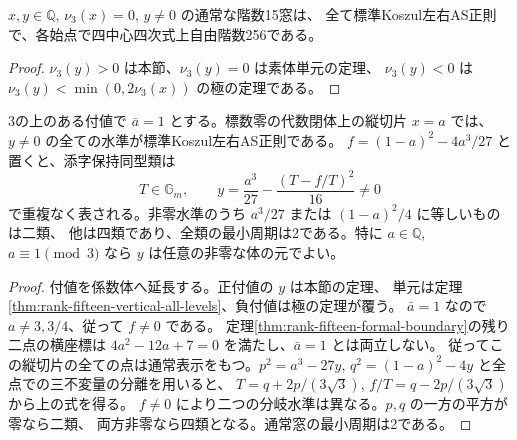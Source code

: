 \begin{corollary}
$x,y\in\mathbb Q$, $\nu_3(x)=0$, $y\ne0$ の通常な階数15窓は、
全て標準Koszul左右AS正則で、各始点で四中心四次式上自由階数256である。
\end{corollary}
\begin{proof}
$\nu_3(y)>0$ は本節、$\nu_3(y)=0$ は素体単元の定理、
$\nu_3(y)<0$ は $\nu_3(y)<\min(0,2\nu_3(x))$ の極の定理である。
\end{proof}

\begin{corollary}\label{cor:rank-fifteen-unit-vertical-conics}
3の上のある付値で $\bar a=1$ とする。標数零の代数閉体上の縦切片 $x=a$ では、
$y\ne0$ の全ての水準が標準Koszul左右AS正則である。
$f=(1-a)^2-4a^3/27$ と置くと、添字保持同型類は
\[
      T\in\mathbb G_m,\qquad
      y=\frac{a^3}{27}-\frac{(T-f/T)^2}{16}\ne0
\]
で重複なく表される。非零水準のうち $a^3/27$ または $(1-a)^2/4$ に等しいものは二類、
他は四類であり、全類の最小周期は2である。特に $a\in\mathbb Q$, $a\equiv1\pmod3$
なら $y$ は任意の非零な体の元でよい。
\end{corollary}
\begin{proof}
付値を係数体へ延長する。正付値の $y$ は本節の定理、
単元は定理\ref{thm:rank-fifteen-vertical-all-levels}、負付値は極の定理が覆う。
$\bar a=1$ なので $a\ne3,3/4$、従って $f\ne0$ である。
定理\ref{thm:rank-fifteen-formal-boundary}の残り二点の横座標は
$4a^2-12a+7=0$ を満たし、$\bar a=1$ とは両立しない。
従ってこの縦切片の全ての点は通常表示をもつ。$p^2=a^3-27y$,
$q^2=(1-a)^2-4y$ と全点での三不変量の分離を用いると、
$T=q+2p/(3\sqrt3)$, $f/T=q-2p/(3\sqrt3)$ から上の式を得る。
$f\ne0$ により二つの分岐水準は異なる。$p,q$ の一方の平方が零なら二類、
両方非零なら四類となる。通常窓の最小周期は2である。
\end{proof}
